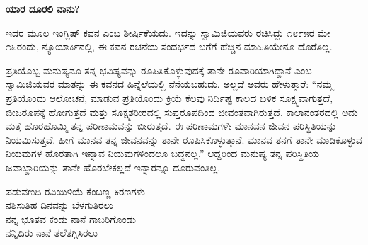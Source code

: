 \begin{myquote}
\end{myquote}

\begin{myquote}
\end{myquote}

\begin{myquote}
\end{myquote}

\selectkan

\begin{center}
\textbf{ಯಾರ ದೂರಲಿ ನಾನು?}
\end{center}

ಇದರ ಮೂಲ ಇಂಗ್ಲಿಷ್ ಕವನ  ಎಂಬ ಶೀರ್ಷಿಕೆಯದು. ಇದನ್ನು ಸ್ವಾಮಿಜಿಯವರು ರಚಿಸಿದ್ದು ೧೮೯೫ರ ಮೇ ೧೬ರಂದು, ನ್ಯೂಯಾರ್ಕಿನಲ್ಲಿ, ಈ ಕವನ ರಚನೆಯ ಸಂದರ್ಭದ ಬಗೆಗೆ ಹೆಚ್ಚಿನ ಮಾಹಿತಿಯೇನೂ ದೊರೆತಿಲ್ಲ.

ಪ್ರತಿಯೊಬ್ಬ ಮನುಷ್ಯನೂ ತನ್ನ ಭವಿಷ್ಯವನ್ನು ರೂಪಿಸಿಕೊಳ್ಳುವುದಕ್ಕೆ ತಾನೇ ರೂವಾರಿಯಾಗಿದ್ದಾನೆ ಎಂಬ ಸ್ವಾಮಿಜಿಯವರ ಮಾತನ್ನು ಈ ಕವನದ ಹಿನ್ನೆಲೆಯಲ್ಲಿ ನೆನೆಯಬಹುದು. ಅಲ್ಲದೆ ಅವರು ಹೇಳುತ್ತಾರೆ: “ನಮ್ಮ ಪ್ರತಿಯೊಂದು ಆಲೋಚನೆ, ಮಾಡುವ ಪ್ರತಿಯೊಂದು ಕ್ರಿಯೆ ಕೆಲವು ನಿರ್ದಿಷ್ಟ ಕಾಲದ ಬಳಿಕ ಸೂಕ್ಷ್ಮವಾಗುತ್ತದೆ, ಬೀಜರೂಪಕ್ಕೆ ಹೋಗುತ್ತದೆ ಮತ್ತು ಸೂಕ್ಷ್ಮಶರೀರದಲ್ಲಿ ಸುಪ್ತರೂಪದಿಂದ ಜೀವಂತವಾಗಿರುತ್ತದೆ. ಕಾಲಾನಂತರದಲ್ಲಿ ಅದು ಮತ್ತೆ ಹೊರಹೊಮ್ಮಿ ತನ್ನ ಪರಿಣಾಮವನ್ನು ಬೀರುತ್ತದೆ. ಈ ಪರಿಣಾಮಗಳೇ ಮಾನವನ ಜೀವನ ಪರಿಸ್ಥಿತಿಯನ್ನು ನಿಯಮಿಸುತ್ತವೆ. ಹೀಗೆ ಮಾನವ ತನ್ನ ಜೀವನವನ್ನು ತಾನೇ ರೂಪಿಸಿಕೊಳ್ಳುತ್ತಾನೆ. ಮಾನವ ತನಗೆ ತಾನೇ ಮಾಡಿಕೊಳ್ಳುವ ನಿಯಮಗಳ ಹೊರತಾಗಿ ಇನ್ನಾವ ನಿಯಮಗಳಿಂದಲೂ ಬದ್ಧನಲ್ಲ.” ಆದ್ದರಿಂದ ಮನುಷ್ಯ ತನ್ನ ಪರಿಸ್ಥಿತಿಯ ಜವಾಬ್ದಾರಿಯನ್ನು ತಾನೇ ಹೊರಬೇಕಲ್ಲದೆ ಇನ್ನಾರನ್ನೂ ದೂರುವಂತಿಲ್ಲ.

\begin{myquote}
ಪಡುವಣದಿ ರವಿಯಿಳಿಯೆ ಕೆಂಬಣ್ಣ ಕಿರಣಗಳು\\ನಶಿಸುತಿಹ ದಿನವನ್ನು ಬೆಳಗುತಿರಲು\\ನನ್ನ ಭೂತವ ಕಂಡು ನಾನೆ ಗಾಬರಿಗೊಂಡು\\ನನ್ನಿದಿರು ನಾನೆ ತಲೆತಗ್ಗಿಸಿರಲು
\end{myquote}

